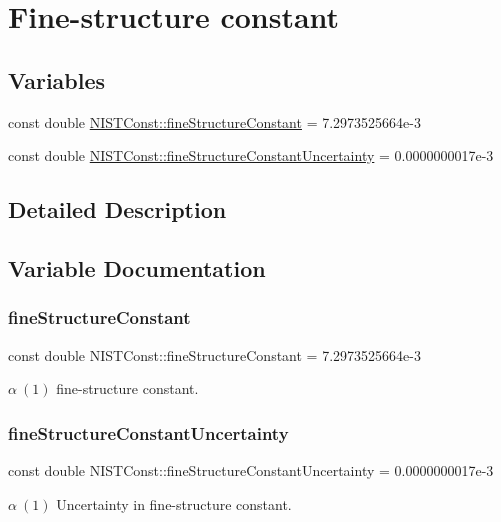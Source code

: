 \hypertarget{group___fine_structure_constant}{}\section{Fine-\/structure constant}
\label{group___fine_structure_constant}
\subsection*{Variables}
\begin{DoxyCompactItemize}
\item 
const double \hyperlink{group___fine_structure_constant_ga0f1ddaca2627b7253ed177aa1b074724}{N\+I\+S\+T\+Const\+::fine\+Structure\+Constant} = 7.\+2973525664e-\/3
\item 
const double \hyperlink{group___fine_structure_constant_ga18067d14fb16cc6418212812405e6496}{N\+I\+S\+T\+Const\+::fine\+Structure\+Constant\+Uncertainty} = 0.\+0000000017e-\/3
\end{DoxyCompactItemize}


\subsection{Detailed Description}


\subsection{Variable Documentation}
\mbox{\label{group___fine_structure_constant_ga0f1ddaca2627b7253ed177aa1b074724}} 
\subsubsection{\texorpdfstring{fine\+Structure\+Constant}{fineStructureConstant}}
{\footnotesize\ttfamily const double N\+I\+S\+T\+Const\+::fine\+Structure\+Constant = 7.\+2973525664e-\/3}

$\alpha \ (1)$ fine-\/structure constant. \mbox{\label{group___fine_structure_constant_ga18067d14fb16cc6418212812405e6496}} 
\subsubsection{\texorpdfstring{fine\+Structure\+Constant\+Uncertainty}{fineStructureConstantUncertainty}}
{\footnotesize\ttfamily const double N\+I\+S\+T\+Const\+::fine\+Structure\+Constant\+Uncertainty = 0.\+0000000017e-\/3}

$\alpha \ (1)$ Uncertainty in fine-\/structure constant. 